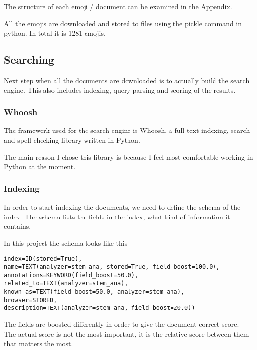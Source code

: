 \documentclass[a4paper]{article}
\begin{document}
The structure of each emoji / document can be examined in the Appendix.

All the emojis are downloaded and stored to files using the pickle command in python. In total it is 1281 emojis.



\subsection{Searching} %
\label{sub:searching}


Next step when all the documents are downloaded is to actually build the search engine. This also includes indexing, query parsing and scoring of the results.

\subsubsection{Whoosh} %
\label{ssub:whoosh}

The framework used for the search engine is Whoosh, a full text indexing, search and spell checking library written in Python. \cite{ wh}

The main reason I chose this library is because I feel most comfortable working in Python at the moment.


\subsubsection{Indexing} %
\label{ssub:indexing}

In order to start indexing the documents, we need to define the schema of the index. The schema lists the fields in the index, what kind of information it contains.

In this project the schema looks like this:

\begin{verbatim}
index=ID(stored=True),
name=TEXT(analyzer=stem_ana, stored=True, field_boost=100.0),
annotations=KEYWORD(field_boost=50.0),
related_to=TEXT(analyzer=stem_ana),
known_as=TEXT(field_boost=50.0, analyzer=stem_ana),
browser=STORED,
description=TEXT(analyzer=stem_ana, field_boost=20.0))
\end{verbatim}

The fields are boosted differently in order to give the document correct score. The actual score is not the most important, it is the relative score between them that matters the most. 
\end{document}
